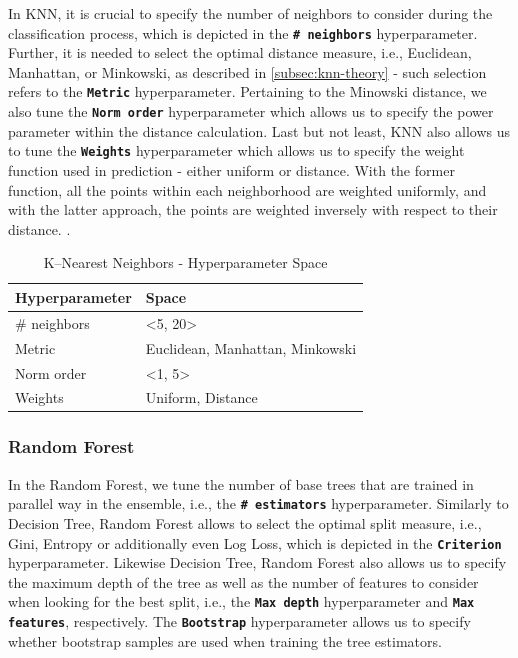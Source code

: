 In KNN, it is crucial to specify the number of neighbors to consider during the classification process, which is depicted in the \textbf{\texttt{\# neighbors}} hyperparameter.
Further, it is needed to select the optimal distance measure, i.e., Euclidean, Manhattan, or Minkowski, as described in \autoref{subsec:knn-theory} - such selection refers to the \textbf{\texttt{Metric}} hyperparameter.
Pertaining to the Minowski distance, we also tune the \textbf{\texttt{Norm order}} hyperparameter which allows us to specify the power parameter within the distance calculation.
Last but not least, KNN also allows us to tune the \textbf{\texttt{Weights}} hyperparameter which allows us to specify the weight function used in prediction - either uniform or distance. With the former function, all the points within each neighborhood are weighted uniformly, and with the latter approach, the points are weighted inversely with respect to their distance. \citep{scikit-knn}.
\begin{table}[H]
\small
\setlength{\tabcolsep}{8pt}
\renewcommand{\arraystretch}{1.3}
\centering
    \caption[K--Nearest Neighbors - Hyperparameter Space]{K--Nearest Neighbors - Hyperparameter Space}\label{tab:knnspace}
    \begin{tabular}{ll}
\toprule
\textbf{Hyperparameter} & \textbf{Space}\\
\midrule
\hline
\# neighbors & <5, 20> \\
Metric & Euclidean, Manhattan, Minkowski \\
Norm order & <1, 5> \\
Weights & Uniform, Distance \\
\hline
\bottomrule
\end{tabular}
\vspace{0.7em}

\vspace{-1em}
\end{table}

\subsubsection{Random Forest}
In the Random Forest, we tune the number of base trees that are trained in parallel way in the ensemble, i.e., the \textbf{\texttt{\# estimators}} hyperparameter.
Similarly to Decision Tree, Random Forest allows to select the optimal split measure, i.e., Gini, Entropy or additionally even Log Loss, which is depicted in the \textbf{\texttt{Criterion}} hyperparameter.
Likewise Decision Tree, Random Forest also allows us to specify the maximum depth of the tree as well as the number of features to consider when looking for the best split, i.e., the \textbf{\texttt{Max depth}} hyperparameter and \textbf{\texttt{Max features}}, respectively.
The \textbf{\texttt{Bootstrap}} hyperparameter allows us to specify whether bootstrap samples are used when training the tree estimators.

